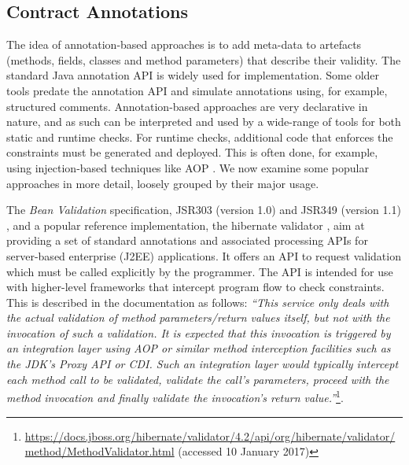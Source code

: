 \documentclass[a4paper,UKenglish]{lipics-v2016}
\begin{document}



\subsection{Contract Annotations}


The idea of annotation-based approaches is to add meta-data to artefacts (methods, fields, classes and method parameters) that describe their validity. The standard Java annotation API is widely used for implementation.  Some older tools predate the annotation API and simulate annotations using, for example, structured comments. Annotation-based approaches are very declarative in nature, and as such can be interpreted and used by a wide-range of tools for both static and runtime checks. For runtime checks, additional code that enforces the constraints must be generated and deployed.  This is often done, for example, using injection-based techniques like AOP \cite{kiczales1997aspect}. We now examine some popular approaches in more detail, loosely grouped by their major usage.

 The \textit{Bean Validation} specification, JSR303 (version 1.0) \cite{JSR303} and JSR349 (version 1.1) \cite{JSR349}, and a popular reference implementation, the hibernate validator \cite{hibernatevalidator}, aim at providing a set of standard annotations and associated processing APIs for server-based enterprise (J2EE) applications.  It offers an API to request validation which must be called explicitly by the programmer.  The API is intended for use with higher-level frameworks that intercept program flow to check constraints. This is described in the documentation as follows: \textit{``This service only deals with the actual validation of method parameters/return values itself, but not with the invocation of such a validation. It is expected that this invocation is triggered by an integration layer using AOP or similar method interception facilities such as the JDK's Proxy API or CDI. Such an integration layer would typically intercept each method call to be validated, validate the call's parameters, proceed with the method invocation and finally validate the invocation's return value.''}\footnote{\url{https://docs.jboss.org/hibernate/validator/4.2/api/org/hibernate/validator/method/MethodValidator.html} (accessed 10 January 2017)}. 
\end{document}
